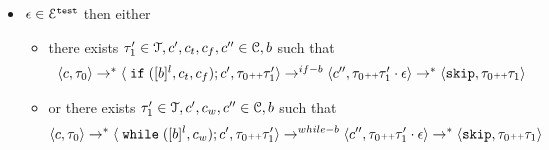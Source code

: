 \begin{lem}
\begin{itemize}
\item $\mathtt{\epsilon}\in \mathcal{E}^{\mathtt{{test}}}$ then either 
\begin{itemize}
\item there exists $\mathtt{\tau}_1' \in \mathcal{T}, c', c_t, c_f, c'' \in \mathcal{C}, b$ such that
\[
\begin{array}{l}
		\langle c, \mathtt{\tau}_0 \rangle \rightarrow^* \langle \;\mathtt{if}\; ([b]^l, c_t, c_f);c', \mathtt{\tau}_0 {\scriptscriptstyle ++} \mathtt{\tau}_1' \rangle \rightarrow^{if-b}
		\langle c'', \mathtt{\tau}_0 {\scriptscriptstyle ++} \mathtt{\tau}_1'\cdot \mathtt{\epsilon}  \rangle \rightarrow^{*}
		\langle \mathtt{skip}, \mathtt{\tau}_0 {\scriptscriptstyle ++} \mathtt{\tau}_1 \rangle 
\end{array}
\]
\item or there exists $ \mathtt{\tau}_1' \in \mathcal{T}, c', c_w, c'' \in \mathcal{C}, b$ such that 
\[
		\langle c, \mathtt{\tau}_0 \rangle \rightarrow^* \langle  \;\mathtt{while}\;([b]^l, c_w);c', \mathtt{\tau}_0 {\scriptscriptstyle ++}  \mathtt{\tau}_1' \rangle \rightarrow^{while-b}
		\langle c'', \mathtt{\tau}_0 {\scriptscriptstyle ++} \mathtt{\tau}_1'\cdot \mathtt{\epsilon}  \rangle \rightarrow^{*}
		\langle \mathtt{skip}, \mathtt{\tau}_0  {\scriptscriptstyle ++} \mathtt{\tau}_1 \rangle
\]
\end{itemize}
\end{itemize}
%
\end{lem}
%
